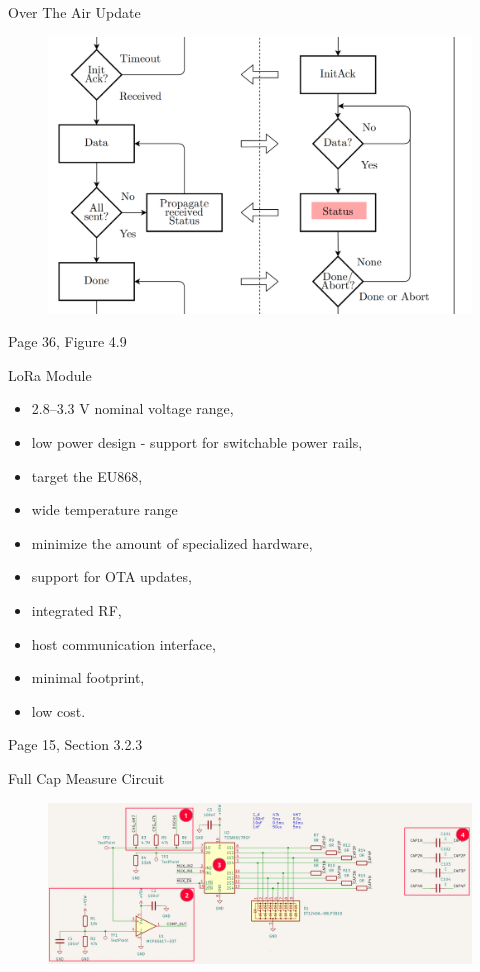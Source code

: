 \documentclass[hyphens]{beamer}
\newcommand{\backupend}{
   \addtocounter{framenumberappendix}{-\value{framenumber}}
   \addtocounter{framenumber}{\value{framenumberappendix}} 
}
\begin{document}
\begin{frame}{Over The Air Update}
\begin{figure}
    \centering
    \includegraphics[width=\linewidth]{img/ota.png}
\end{figure}
\begin{flushright}
    Page 36, Figure 4.9
\end{flushright}
\end{frame}

\begin{frame}{LoRa Module}
\begin{itemize}
    \item 2.8--3.3 V nominal voltage range,
    \item low power design - support for switchable power rails,
    \item target the EU868,
    \item wide temperature range
    \item minimize the amount of specialized hardware,
    \item support for OTA updates,
    \item integrated RF,
    \item host communication interface,
    \item minimal footprint,
    \item low cost.
\end{itemize}
\begin{flushright}
    Page 15, Section 3.2.3
\end{flushright}
\end{frame}

\begin{frame}{Full Cap Measure Circuit}
\begin{figure}
    \centering
    \includegraphics[width=\linewidth]{../thesis/fig/sensor-measure-circuit.png}
\end{figure}
\end{frame}

\backupend
\end{document}
